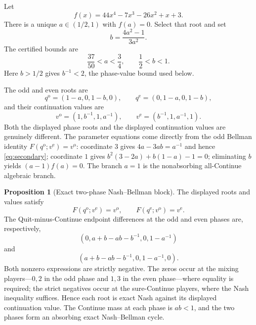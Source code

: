 \documentclass[11pt]{article}
\theoremstyle{definition}
\newtheorem{proposition}{Proposition}
\begin{document}
Let
\begin{equation}
\label{eq:parameters}
 f(x)=44x^4-7x^3-26x^2+x+3.
\end{equation}
There is a unique $a\in(1/2,1)$ with $f(a)=0$.  Select that root and set
\begin{equation}
\label{eq:secondary}
 b=\frac{4a^2-1}{3a^2}.
\end{equation}
The certified bounds are
\begin{equation}
\label{eq:parameter-bounds}
 \frac{37}{50}<a<\frac34,
 \qquad
 \frac12<b<1.
\end{equation}
Here $b>1/2$ gives $b^{-1}<2$, the phase-value bound used below.

The odd and even roots are
\begin{equation}
\label{eq:roots}
 q^{\mathrm o}=(1-a,0,1-b,0),
 \qquad
 q^{\mathrm e}=(0,1-a,0,1-b),
\end{equation}
and their continuation values are
\begin{equation}
\label{eq:values}
 v^{\mathrm o}=(1,b^{-1},1,a^{-1}),
 \qquad
 v^{\mathrm e}=(b^{-1},1,a^{-1},1).
\end{equation}
Both the displayed phase roots and the displayed continuation values are
genuinely different.
The parameter equations come directly from the odd Bellman identity
$F(q^{\mathrm o};v^{\mathrm e})=v^{\mathrm o}$: coordinate $3$ gives
$4a-3ab=a^{-1}$ and hence \eqref{eq:secondary}; coordinate $1$ gives
$b^2(3-2a)+b(1-a)-1=0$; eliminating $b$ yields
$(a-1)f(a)=0$.  The branch $a=1$ is the nonabsorbing all-Continue algebraic
branch.

\begin{proposition}[Exact two-phase Nash--Bellman block]
The displayed roots and values satisfy
\[
 F(q^{\mathrm o};v^{\mathrm e})=v^{\mathrm o},
 \qquad
 F(q^{\mathrm e};v^{\mathrm o})=v^{\mathrm e}.
\]
The Quit-minus-Continue endpoint differences at the odd and even phases are,
respectively,
\[
 \left(0, a+b-ab-b^{-1}, 0, 1-a^{-1}\right)
\]
and
\[
 \left(a+b-ab-b^{-1}, 0, 1-a^{-1}, 0\right).
\]
Both nonzero expressions are strictly negative.  The zeros occur at the
mixing players---$0,2$ in the odd phase and $1,3$ in the even phase---where
equality is required; the strict negatives occur at the sure-Continue players,
where the Nash inequality suffices.  Hence each root is exact Nash against its
displayed continuation value.  The Continue mass at each phase is $ab<1$, and
the two phases form an absorbing exact Nash--Bellman cycle.
\end{proposition}
\end{document}
